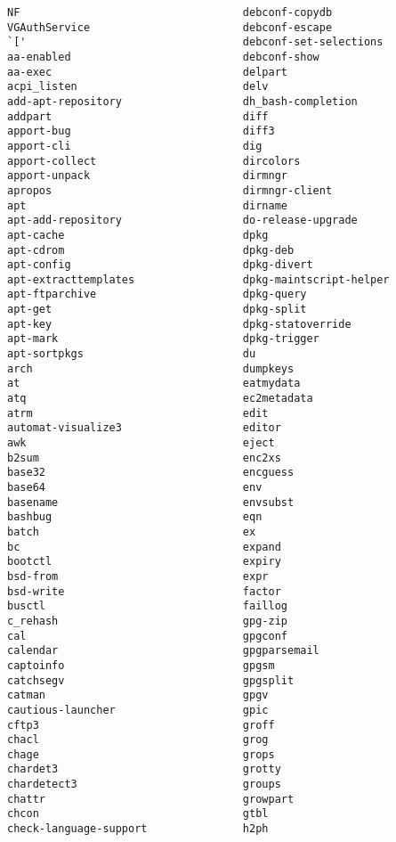 \documentclass[10pt,a4paper,draft]{article}
\begin{document}
\begin{verbatim}
NF                                   debconf-copydb
VGAuthService                        debconf-escape
`['                                  debconf-set-selections
aa-enabled                           debconf-show
aa-exec                              delpart
acpi_listen                          delv
add-apt-repository                   dh_bash-completion
addpart                              diff
apport-bug                           diff3
apport-cli                           dig
apport-collect                       dircolors
apport-unpack                        dirmngr
apropos                              dirmngr-client
apt                                  dirname
apt-add-repository                   do-release-upgrade
apt-cache                            dpkg
apt-cdrom                            dpkg-deb
apt-config                           dpkg-divert
apt-extracttemplates                 dpkg-maintscript-helper
apt-ftparchive                       dpkg-query
apt-get                              dpkg-split
apt-key                              dpkg-statoverride
apt-mark                             dpkg-trigger
apt-sortpkgs                         du
arch                                 dumpkeys
at                                   eatmydata
atq                                  ec2metadata
atrm                                 edit
automat-visualize3                   editor
awk                                  eject
b2sum                                enc2xs
base32                               encguess
base64                               env
basename                             envsubst
bashbug                              eqn
batch                                ex
bc                                   expand
bootctl                              expiry
bsd-from                             expr
bsd-write                            factor
busctl                               faillog
c_rehash                             gpg-zip
cal                                  gpgconf
calendar                             gpgparsemail
captoinfo                            gpgsm
catchsegv                            gpgsplit
catman                               gpgv
cautious-launcher                    gpic
cftp3                                groff
chacl                                grog
chage                                grops
chardet3                             grotty
chardetect3                          groups
chattr                               growpart
chcon                                gtbl
check-language-support               h2ph

\end{verbatim}
\end{document}

